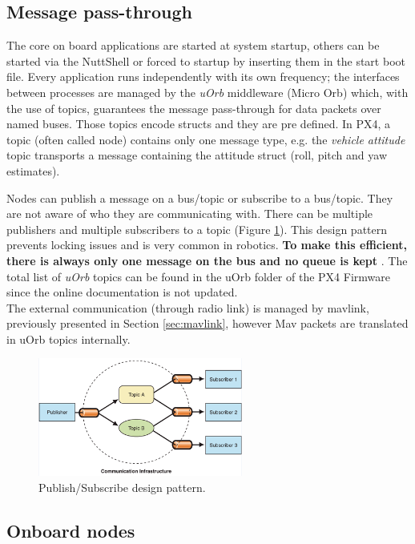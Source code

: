 \subsection{Message pass-through}
The core on board applications are started at system startup, others can be started via the NuttShell or forced to startup by inserting them in the start boot file. Every application runs independently with its own frequency; the interfaces between processes are managed by the \textit{uOrb} middleware (Micro Orb) which, with the use of topics, guarantees the message pass-through for data packets over named buses. Those topics encode structs and they are pre defined. In PX4, a topic (often called node) contains only one message type, e.g. the \textit{vehicle attitude} topic transports a message containing the attitude struct (roll, pitch and yaw estimates).\par Nodes can publish a message on a bus/topic or subscribe to a bus/topic. They are not aware of who they are communicating with. There can be multiple publishers and multiple subscribers to a topic (Figure \ref{figure:pubsub}). This design pattern prevents locking issues and is very common in robotics. \textbf{To make this efficient, there is always only one message on the bus and no queue is kept} \cite{uOrb}. The total list of \textit{uOrb} topics can be found in the uOrb folder of the PX4 Firmware since the online documentation is not updated. \\

\noindent
The external communication (through radio link) is managed by mavlink, previously presented in Section \ref{sec:mavlink}, however Mav packets are translated in uOrb topics internally.   

\begin{figure}[h]
	\centering
	\noindent
	\includegraphics[width=0.6\textwidth]{pub_sub.PNG}
	\caption{Publish/Subscribe design pattern.}
	\label{figure:pubsub}
\end{figure}

\subsection{Onboard nodes}


